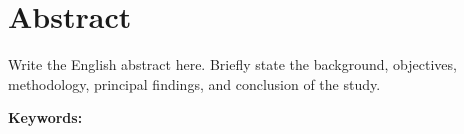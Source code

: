 \chapter*{Abstract}

\begin{english}
Write the English abstract here. Briefly state the background, objectives,
methodology, principal findings, and conclusion of the study.

\vspace{16pt}
\noindent\textbf{Keywords:} \keywordsEN
\end{english}
\clearpage
